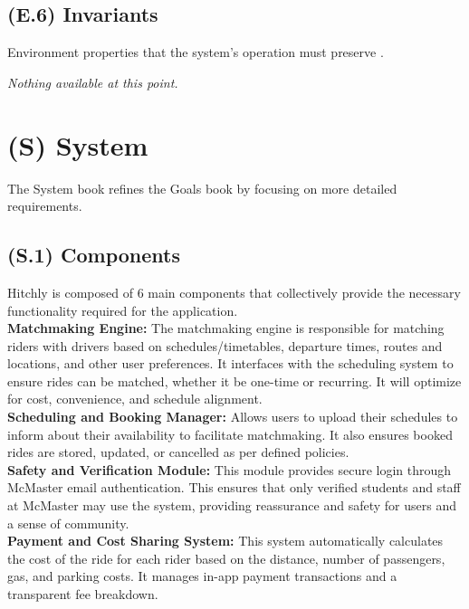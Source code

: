 \documentclass[12pt,letterpaper]{article}
\begin{document}
\subsection{(E.6) Invariants}
Environment properties that the system’s operation must preserve \cite{meyer2022}.

\textit{Nothing available at this point.}

\clearpage

\section{(S) System}
The System book refines the Goals book by focusing on more detailed requirements.

\subsection{(S.1) Components}
Hitchly is composed of 6 main components that collectively provide the necessary functionality required for the application. \\

\noindent \textbf{Matchmaking Engine:} The matchmaking engine is responsible for matching riders with drivers based on schedules/timetables, departure times, routes and locations, and other user preferences. 
It interfaces with the scheduling system to ensure rides can be matched, whether it be one-time or recurring. It will optimize for cost, convenience, and schedule alignment. \\

\noindent \textbf{Scheduling and Booking Manager:} Allows users to upload their schedules to inform about their availability to facilitate matchmaking. It also ensures booked rides are stored, updated, or cancelled as per defined policies.  \\

\noindent \textbf{Safety and Verification Module:} This module provides secure login through McMaster email authentication. This ensures that only verified students and staff at McMaster may use the system, providing reassurance and safety for users and a sense of community. \\

\noindent \textbf{Payment and Cost Sharing System:} This system automatically calculates the cost of the ride for each rider based on the distance, number of passengers, gas, and parking costs. It manages in-app payment transactions and a transparent fee breakdown. \\
\end{document}

